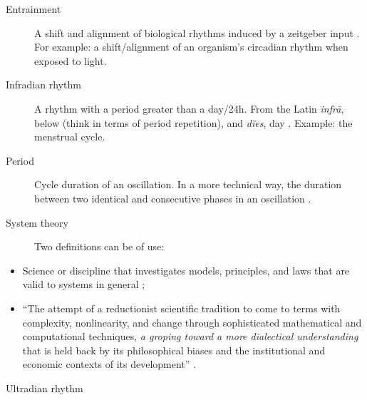 \documentclass[
12pt,
openright,
oneside,
a4paper,
chapter=TITLE,
section=TITLE,
french,
spanish,
brazil,
english
]{abntex2}\usepackage{array}
\newenvironment{glossario}{
  \tocprintchapternonum
}{
  \cleardoublepage
}
\renewcommand{\tocprintchapternonum}{
  \addtocontents{toc}{\setlength{\cftchapterindent}{5.65em}}
  \addtocontents{toc}{\setlength{\cftchapternumwidth}{0em}}
}
\begin{document}
\begin{glossario}
\begin{description}
\item[Entrainment]
\hspace{20cm}

A shift and alignment of biological rhythms induced by a zeitgeber input
\autocite{kuhlman2018}. For example: a shift/alignment of an organism's
circadian rhythm when exposed to light.
\end{description}

\begin{description}
\item[Infradian rhythm]
\hspace{20cm}

A rhythm with a period greater than a day/24h. From the Latin
\emph{infrā}, below (think in terms of period repetition), and
\emph{dĭes}, day \autocite{latinitium}. Example: the menstrual cycle.
\item[Period]
\hspace{20cm}

Cycle duration of an oscillation. In a more technical way, the duration
between two identical and consecutive phases in an oscillation
\autocite{kuhlman2018}.
\end{description}

\begin{description}
\item[System theory]
\hspace{20cm}

Two definitions can be of use:
\end{description}

\begin{itemize}
\tightlist
\item
  Science or discipline that investigates models, principles, and laws
  that are valid to systems in general \autocite{bertalanffy1968};
\item
  ``The attempt of a reductionist scientific tradition to come to terms
  with complexity, nonlinearity, and change through sophisticated
  mathematical and computational techniques, \emph{a groping toward a
  more dialectical understanding} that is held back by its philosophical
  biases and the institutional and economic contexts of its
  development'' \autocite{levins1998}.
\end{itemize}

\begin{description}
\item[Ultradian rhythm]
\hspace{20cm}


\end{description}
\end{glossario}
\end{document}
